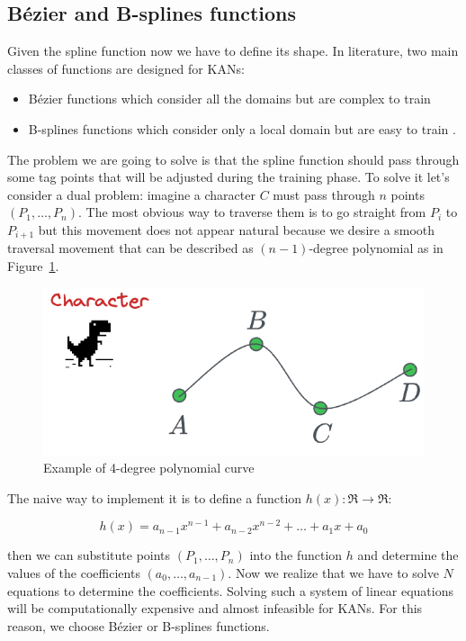 \documentclass[12pt,a4paper]{article}
\begin{document}
\subsection{Bézier and B-splines functions}
Given the spline function now we have to define its shape. In literature, two main classes of functions are designed for KANs:
\begin{itemize}
    \item Bézier functions which consider all the domains but are complex to train \cite{bezier}
    \item B-splines functions which consider only a local domain but are easy to train \cite{kan_intro}.
\end{itemize}

The problem we are going to solve is that the spline function should pass through some tag points that will be adjusted during the training phase. To solve it let's consider a dual problem: imagine a character $C$ must pass through $n$ points $(P_1, \dots,P_n)$. The most obvious way to traverse them is to go straight from $P_i$ to $P_{i+1}$ but this movement does not appear natural because we desire a smooth traversal movement that can be described as $(n-1)$-degree polynomial as in Figure~\ref{fig:bezier}.  
\begin{figure}[H]
    \centering
    \includegraphics[width=0.5\linewidth]{Images/bezier.png}
    \caption{Example of 4-degree polynomial curve}
    \label{fig:bezier}
\end{figure}

The naive way to implement it is to define a function $h(x): \Re \to \Re$:

$$h(x) = a_{n-1}x^{n-1} + a_{n-2}x^{n-2} + \dots + a_1x +a_0 $$

then we can substitute points $(P_1, \dots,P_n)$ into the function $h$ and determine the values of the coefficients $(a_0, \dots,a_{n-1})$. Now we realize that we have to solve $N$ equations to determine the coefficients. Solving such a system of linear equations will be computationally expensive and almost infeasible for KANs. For this reason, we choose Bézier or B-splines functions.
\end{document}
